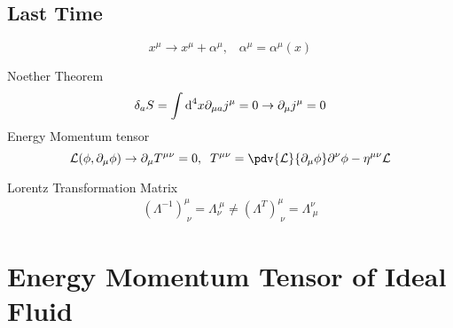 \subsection{Last Time}
$$
x^\mu \rightarrow x^\mu + \alpha^\mu,\;\;\;\alpha^\mu = \alpha^\mu(x)
$$

Noether Theorem
\begin{equation}
	\delta_a S = \int \text d^4x \partial_{\mu a}j^\mu = 0 \rightarrow \partial_\mu j^\mu = 0
\end{equation}
Energy Momentum tensor
\begin{equation}
	\mathcal L(\phi, \partial_\mu\phi) \rightarrow \partial_\mu T^{\mu\nu} = 0,\;\; T^{\mu\nu} = \pdv{\mathcal L}{\partial_\mu\phi}\partial^\nu\phi - \eta^{\mu\nu}\mathcal L
\end{equation}

Lorentz Transformation Matrix
\begin{gather}
	(\Lambda^{-1})^\mu_{\;\nu} = \Lambda_\nu^{\;\mu} \neq (\Lambda^T)^\mu_{\;\nu} = \Lambda^\nu_{\;\mu}
\end{gather}

\section{Energy Momentum Tensor of Ideal Fluid}


